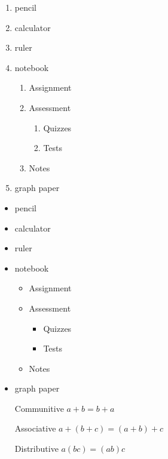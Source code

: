 \documentclass[11pt]{article}
\begin{document}
\begin{enumerate}
\item pencil
\item calculator
\item ruler
\item notebook 
    \begin{enumerate}
    \item Assignment
    \item Assessment
      \begin{enumerate}
      \item Quizzes
      \item Tests
      \end{enumerate}
    \item Notes
    \end{enumerate}
\item graph paper
\end{enumerate}


\begin{itemize}
\item pencil
\item calculator
\item ruler
\item notebook 
    \begin{itemize}
    \item Assignment
    \item Assessment
      \begin{itemize}
      \item Quizzes
      \item Tests
      \end{itemize}
    \item Notes
    \end{itemize}
\item graph paper
\end{itemize}

\begin{enumerate}
\item[Communitive] $a+b=b+a$
\item[Associative] $a+(b+c)=(a+b)+c$
\item[Distributive] $a(bc)=(ab)c$

\end{enumerate}
\end{document}
